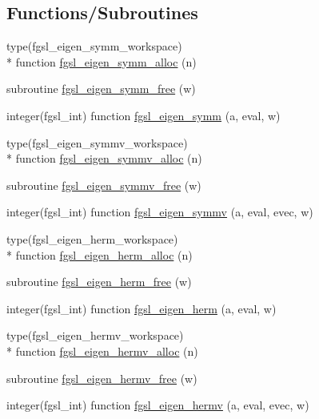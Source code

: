 \subsection*{Functions/\-Subroutines}
\begin{DoxyCompactItemize}
\item 
type(fgsl\-\_\-eigen\-\_\-symm\-\_\-workspace) \\*
function \hyperlink{eigen_8finc_a4911814478ea47e01623311df0dfe1b7}{fgsl\-\_\-eigen\-\_\-symm\-\_\-alloc} (n)
\item 
subroutine \hyperlink{eigen_8finc_a9127a0929117934b84723c05fe120916}{fgsl\-\_\-eigen\-\_\-symm\-\_\-free} (w)
\item 
integer(fgsl\-\_\-int) function \hyperlink{eigen_8finc_a5a37dd1d463478768f432232bf994e43}{fgsl\-\_\-eigen\-\_\-symm} (a, eval, w)
\item 
type(fgsl\-\_\-eigen\-\_\-symmv\-\_\-workspace) \\*
function \hyperlink{eigen_8finc_ad1fec4036528852c97539008a009c875}{fgsl\-\_\-eigen\-\_\-symmv\-\_\-alloc} (n)
\item 
subroutine \hyperlink{eigen_8finc_a3f312c4069b7de24f2a7b9112bd11fab}{fgsl\-\_\-eigen\-\_\-symmv\-\_\-free} (w)
\item 
integer(fgsl\-\_\-int) function \hyperlink{eigen_8finc_a42022987fd3e17b60db77ce044515bc1}{fgsl\-\_\-eigen\-\_\-symmv} (a, eval, evec, w)
\item 
type(fgsl\-\_\-eigen\-\_\-herm\-\_\-workspace) \\*
function \hyperlink{eigen_8finc_a6a713bfd56b0df2694ba508eb70ea7b0}{fgsl\-\_\-eigen\-\_\-herm\-\_\-alloc} (n)
\item 
subroutine \hyperlink{eigen_8finc_ab28944c18e254129ddf3289f7b8d8bc4}{fgsl\-\_\-eigen\-\_\-herm\-\_\-free} (w)
\item 
integer(fgsl\-\_\-int) function \hyperlink{eigen_8finc_ad73920fff8c0f5043f47fbf2930280cb}{fgsl\-\_\-eigen\-\_\-herm} (a, eval, w)
\item 
type(fgsl\-\_\-eigen\-\_\-hermv\-\_\-workspace) \\*
function \hyperlink{eigen_8finc_af23f2bdc295d9082a0cd3d383788199a}{fgsl\-\_\-eigen\-\_\-hermv\-\_\-alloc} (n)
\item 
subroutine \hyperlink{eigen_8finc_a6a876223b366e9e91962c7106148929c}{fgsl\-\_\-eigen\-\_\-hermv\-\_\-free} (w)
\item 
integer(fgsl\-\_\-int) function \hyperlink{eigen_8finc_ab9e8f1e044d459595f880d4c380f537f}{fgsl\-\_\-eigen\-\_\-hermv} (a, eval, evec, w)

\end{DoxyCompactItemize}
